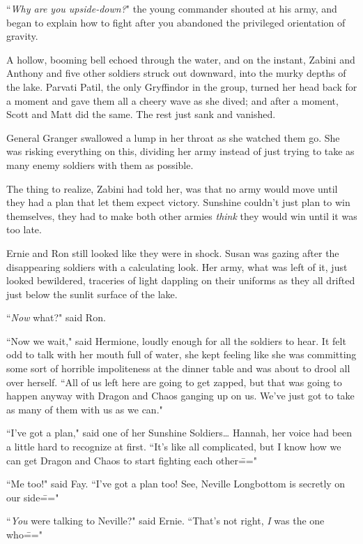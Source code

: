 ``\emph{Why are you upside-down?}" the young commander shouted at his army, and began to explain how to fight after you abandoned the privileged orientation of gravity.

\later

A hollow, booming bell echoed through the water, and on the instant, Zabini and Anthony and five other soldiers struck out downward, into the murky depths of the lake. Parvati Patil, the only Gryffindor in the group, turned her head back for a moment and gave them all a cheery wave as she dived; and after a moment, Scott and Matt did the same. The rest just sank and vanished.

General Granger swallowed a lump in her throat as she watched them go. She was risking everything on this, dividing her army instead of just trying to take as many enemy soldiers with them as possible.

The thing to realize, Zabini had told her, was that no army would move until they had a plan that let them expect victory. Sunshine couldn't just plan to win themselves, they had to make both other armies \emph{think} they would win until it was too late.

Ernie and Ron still looked like they were in shock. Susan was gazing after the disappearing soldiers with a calculating look. Her army, what was left of it, just looked bewildered, traceries of light dappling on their uniforms as they all drifted just below the sunlit surface of the lake.

``\emph{Now} what?" said Ron.

``Now we wait," said Hermione, loudly enough for all the soldiers to hear. It felt odd to talk with her mouth full of water, she kept feeling like she was committing some sort of horrible impoliteness at the dinner table and was about to drool all over herself. ``All of us left here are going to get zapped, but that was going to happen anyway with Dragon and Chaos ganging up on us. We've just got to take as many of them with us as we can."

``I've got a plan," said one of her Sunshine Soldiers{\ldots} Hannah, her voice had been a little hard to recognize at first. ``It's like all complicated, but I know how we can get Dragon and Chaos to start fighting each other\==="

``Me too!" said Fay. ``I've got a plan too! See, Neville Longbottom is secretly on our side\==="

``\emph{You} were talking to Neville?" said Ernie. ``That's not right, \emph{I} was the one who\==="

